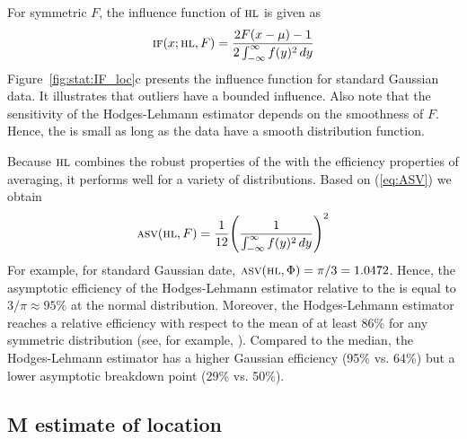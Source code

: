 For symmetric $F$, the influence function of $\stsc{HL}$ is given as
\[
    \stsc{IF}(x; \stsc{HL}, F) = \frac{2 F(x-\mu) - 1}{2 \int_{-\infty}^\infty f(y)^2 \dif y}
\]
Figure~\ref{fig:stat:IF_loc}c presents the influence function for standard Gaussian
data. It illustrates that outliers have a bounded influence. Also note that the 
sensitivity of the Hodges-Lehmann estimator depends on the smoothness of $F$.
Hence, the  is small as long as the data have a  
smooth distribution function.

Because $\stsc{HL}$ combines the robust properties of the  with the
efficiency properties of averaging, it performs well for a variety of
distributions. Based on (\ref{eq:ASV}) we obtain
\[
    \stsc{ASV}(\stsc{HL}, F) = \frac{1}{12} \left(\frac{1}{\int_{-\infty}^\infty f(y)^2 \dif y}\right)^2
\]
For example, for standard Gaussian date, $\stsc{ASV}(\stsc{HL}, \Phi) =
\pi/3 = 1.0472$. Hence, the asymptotic efficiency of the Hodges-Lehmann
estimator relative to the  is equal to $3/\pi \approx 95\%$ at the
normal distribution. Moreover, the Hodges-Lehmann estimator reaches a relative
efficiency with respect to the mean of at least 86\% for any symmetric
distribution (see, for example, \citealp[p. 120-121]{staudte:sheather:1990}).
Compared to the median, the Hodges-Lehmann estimator has a higher Gaussian
efficiency (95\% vs. 64\%) but a lower asymptotic breakdown point (29\% vs.
50\%).


\subsection{M estimate of location}

